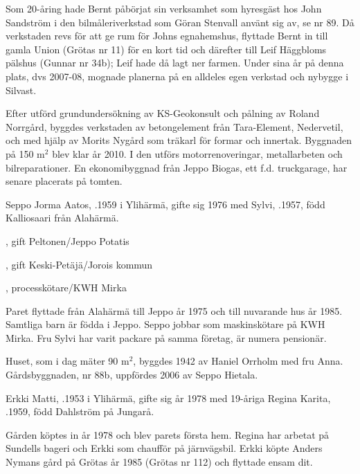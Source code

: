 Som 20-åring hade Bernt påbörjat sin verksamhet som hyresgäst	hos John Sandström i den bilmåleriverkstad som Göran Stenvall använt sig av, se nr 89. Då verkstaden revs för att ge rum för Johns egnahemshus, flyttade Bernt in till gamla Union (Grötas nr 11) för en kort tid och därefter till Leif Häggbloms pälshus (Gunnar nr 34b); Leif hade då lagt ner farmen. Under sina år på denna plats, dvs 2007-08, mognade	planerna på en alldeles egen verkstad och nybygge i Silvast.

Efter utförd grundundersökning av KS-Geokonsult och pålning av Roland Norrgård, byggdes verkstaden av betongelement från Tara-Element, Nedervetil, och med hjälp av Morits Nygård som träkarl för formar och innertak. Byggnaden på 150 m$^2$ blev klar år 2010. I den utförs	motorrenoveringar, metallarbeten och bilreparationer. En ekonomibyggnad från Jeppo Biogas, ett f.d. truckgarage, har senare placerats på tomten.






Seppo Jorma Aatos, .1959 i Ylihärmä, gifte sig 1976 med Sylvi, .1957,	född Kalliosaari från Alahärmä.
\begin{jhchildren}
  \item {}, gift Peltonen/Jeppo Potatis
  \item {}, gift Keski-Petäjä/Jorois kommun
  \item {}, processkötare/KWH Mirka
\end{jhchildren}

Paret flyttade från Alahärmä till Jeppo år 1975 och till nuvarande hus år 1985. Samtliga barn är födda i Jeppo. Seppo jobbar som maskinskötare på KWH Mirka. Fru Sylvi har varit packare på samma företag, är numera pensionär.

Huset, som i dag mäter 90 m$^2$, byggdes 1942 av Haniel Orrholm med fru Anna. Gårdsbyggnaden, nr 88b, uppfördes 2006 av Seppo Hietala.


Erkki Matti, .1953 i Ylihärmä, gifte sig år 1978 med 19-åriga Regina Karita, .1959, född Dahlström på Jungarå.
\begin{jhchildren}
  \item {}
  \item {}
\end{jhchildren}
Gården köptes in år 1978 och blev parets första hem. Regina har arbetat på Sundells bageri och Erkki som chaufför på järnvägsbil. Erkki köpte Anders Nymans gård på Grötas år 1985 (Grötas nr 112) och flyttade ensam dit.


